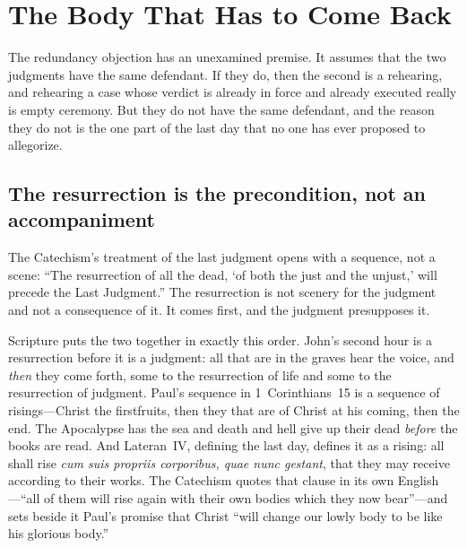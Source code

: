 \section{The Body That Has to Come Back}\label{sec:body}

The redundancy objection has an unexamined premise. It assumes that the two judgments have the same defendant. If they do, then the second is a rehearing, and rehearing a case whose verdict is already in force and already executed really is empty ceremony. But they do not have the same defendant, and the reason they do not is the one part of the last day that no one has ever proposed to allegorize.

\subsection{The resurrection is the precondition, not an accompaniment}

The Catechism's treatment of the last judgment opens with a sequence, not a scene: ``The resurrection of all the dead, `of both the just and the unjust,' will precede the Last Judgment.'' The resurrection is not scenery for the judgment and not a consequence of it. It comes first, and the judgment presupposes it.

Scripture puts the two together in exactly this order. John's second hour is a resurrection before it is a judgment: all that are in the graves hear the voice, and \emph{then} they come forth, some to the resurrection of life and some to the resurrection of judgment. Paul's sequence in 1~Corinthians~15 is a sequence of risings---Christ the firstfruits, then they that are of Christ at his coming, then the end. The Apocalypse has the sea and death and hell give up their dead \emph{before} the books are read. And Lateran~IV, defining the last day, defines it as a rising: all shall rise \emph{cum suis propriis corporibus, quae nunc gestant}, that they may receive according to their works. The Catechism quotes that clause in its own English---``all of them will rise again with their own bodies which they now bear''---and sets beside it Paul's promise that Christ ``will change our lowly body to be like his glorious body.''

